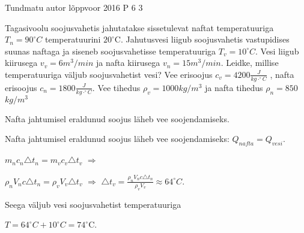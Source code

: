 {Tundmatu autor} %
{lõppvoor} %
{2016} %
{P 6} %
{3} %
{

\ifStatement
Tagasivoolu soojusvahetis jahutatakse sissetulevat naftat temperatuuriga $T_n = 90 ^{\circ}C$ temperatuurini $20^{\circ}$C. Jahutusvesi liigub soojusvahetis vastupidises suunas naftaga ja siseneb soojusvahetisse temperatuuriga $T_v = 10 ^{\circ}C$. Vesi liigub kiirusega $v_v = 6 m^3/min$ ja nafta kiirusega $v_n = 15 m^3/min$. Leidke, millise temperatuuriga väljub soojusvahetist vesi? Vee erisoojus $c_v = 4200 \frac{J}{kg \cdot ^{\circ}C}$ , nafta erisoojus $c_n = 1800 \frac{J}{kg \cdot ^{\circ}C}$. Vee tihedus $\rho_v = 1000 kg/m^3$ ja nafta tihedus $\rho_n = 850$ $kg/m^3$
\fi

\ifHint
Nafta jahtumisel eraldunud soojus läheb vee soojendamiseks.
\fi

\ifSolution
Nafta jahtumisel eraldunud soojus läheb vee soojendamiseks: $Q_{nafta} = Q_{vesi}$.
\begin{center}
$m_n c_n \triangle t_n = m_v c_v \triangle t_v$ $\Rightarrow$ 
\end{center}
\begin{center}
$\rho_n V_n c \triangle t_n = \rho_v V_v \triangle t_v$ $\Rightarrow$ $\triangle t_v = \frac{\rho_n V_n c \triangle t_n}{\rho_v V_v} \approx 64 ^{\circ}C$.
\end{center}
Seega väljub vesi soojusvahetist temperatuuriga
\begin{center}
$T = 64 ^{\circ}C + 10  ^{\circ}C = 74  ^{\circ}$C.
\end{center}
\fi
}